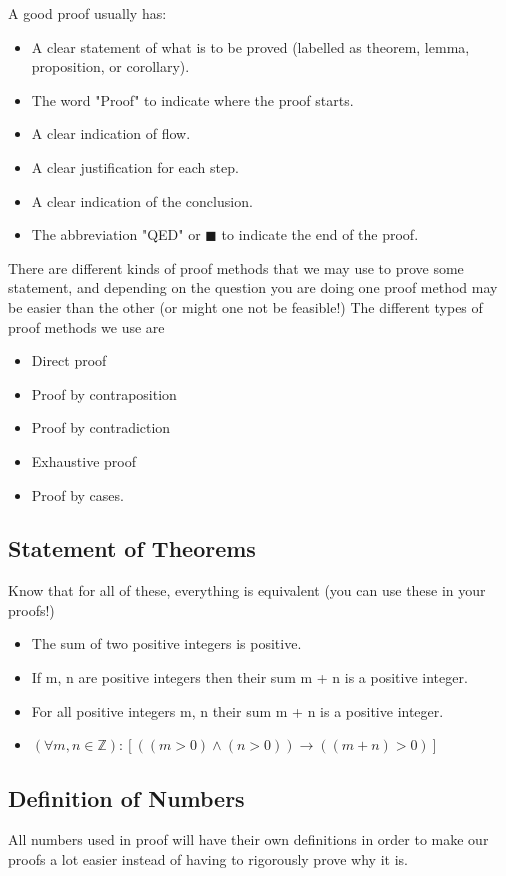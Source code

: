 A good proof usually has:

\begin{itemize}
    \item A clear statement of what is to be proved (labelled as theorem, lemma, proposition, or corollary).
    \item The word "Proof" to indicate where the proof starts.
    \item A clear indication of flow.
    \item A clear justification for each step.
    \item A clear indication of the conclusion.
    \item The abbreviation "QED" or $\blacksquare$ to indicate the end of the proof.
\end{itemize}

There are different kinds of proof methods that we may use to prove some statement, and depending on the question you are doing one proof method may be easier than the other (or might one not be feasible!) The different types of proof methods we use are

\begin{itemize}
    \item Direct proof
    \item Proof by contraposition
    \item Proof by contradiction
    \item Exhaustive proof
    \item Proof by cases.
\end{itemize}

\subsection{Statement of Theorems}
Know that for all of these, everything is equivalent (you can use these in your proofs!)

\begin{itemize}
    \item The sum of two positive integers is positive.
    \item If m, n are positive integers then their sum m + n is a positive integer.
    \item For all positive integers m, n their sum m + n is a positive integer.
    \item $(\forall m,n \in \mathbb{Z}) : [((m > 0)\land (n > 0)) \rightarrow ((m+n)>0)]$
\end{itemize}

\subsection{Definition of Numbers}
All numbers used in proof will have their own definitions in order to make our proofs a lot easier instead of having to rigorously prove why it is.

